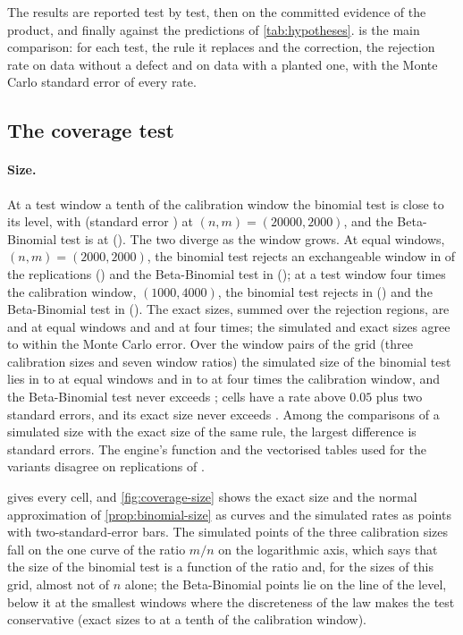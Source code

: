 The results are reported test by test, then on the committed evidence of the product, and finally against the predictions of \cref{tab:hypotheses}.  is the main comparison: for each test, the rule it replaces and the correction, the rejection rate on data without a defect and on data with a planted one, with the Monte Carlo standard error of every rate.



\subsection{The coverage test}

\paragraph{Size.} At a test window a tenth of the calibration window the binomial test is close to its level, with \CovSinBinA{} (standard error \CovSeBinA{}) at $(n,m)=(20000,2000)$, and the Beta-Binomial test is at \CovSinBBA{} (\CovSeBBA{}). The two diverge as the window grows. At equal windows, $(n,m)=(2000,2000)$, the binomial test rejects an exchangeable window in \CovSinBinB{} of the replications (\CovSeBinB{}) and the Beta-Binomial test in \CovSinBBB{} (\CovSeBBB{}); at a test window four times the calibration window, $(1000,4000)$, the binomial test rejects in \CovSinBinC{} (\CovSeBinC{}) and the Beta-Binomial test in \CovSinBBC{} (\CovSeBBC{}). The exact sizes, summed over the rejection regions, are \CovExBinB{} and \CovExBBB{} at equal windows and \CovExBinC{} and \CovExBBC{} at four times; the simulated and exact sizes agree to within the Monte Carlo error. Over the \CovGridCells{} window pairs of the grid (three calibration sizes and seven window ratios) the simulated size of the binomial test lies in \CovSimBinMinOne{} to \CovSimBinMaxOne{} at equal windows and in \CovSimBinMinFour{} to \CovSimBinMaxFour{} at four times the calibration window, and the Beta-Binomial test never exceeds \CovBBMaxRate{}; \CovBBOverBound{} cells have a rate above $0.05$ plus two standard errors, and its exact size never exceeds \CovBBMaxExact{}. Among the \CovMcCompare{} comparisons of a simulated size with the exact size of the same rule, the largest difference is \CovMcExactMaxZ{} standard errors. The engine's function and the vectorised tables used for the variants disagree on \CovEngineMismatches{} replications of \CovTotalReps{}.

 gives every cell, and \cref{fig:coverage-size} shows the exact size and the normal approximation of \cref{prop:binomial-size} as curves and the simulated rates as points with two-standard-error bars. The simulated points of the three calibration sizes fall on the one curve of the ratio $m/n$ on the logarithmic axis, which says that the size of the binomial test is a function of the ratio and, for the sizes of this grid, almost not of $n$ alone; the Beta-Binomial points lie on the line of the level, below it at the smallest windows where the discreteness of the law makes the test conservative (exact sizes \CovExBBMinTenth{} to \CovExBBMaxTenth{} at a tenth of the calibration window).

